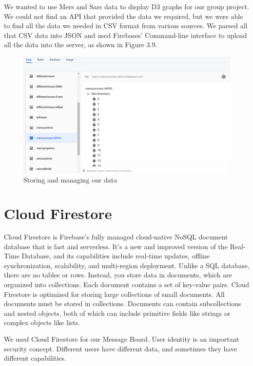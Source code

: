 We wanted to use Mers and Sars data to display D3 graphs for our group project.
We could not find an API that provided the data we required, but we were able to find all the data we needed in CSV format from various sources. 
We parsed all that CSV data into JSON and used Firebases’ Command-line interface to upload all the data into the server, as shown in Figure 3.9.

\begin{figure}[H]
    \centering
    \includegraphics[scale=0.35]{img/Firebasedb.PNG}
    \caption{Storing and managing our data}
    \label{fig:my_labe4}
\end{figure}

\section{Cloud Firestore}
Cloud Firestore is Firebase's fully managed cloud-native NoSQL document database that is fast and serverless. It's a new and improved version of the Real-Time Database, and its capabilities include real-time updates, offline synchronization, scalability, and multi-region deployment. Unlike a SQL database, there are no tables or rows. Instead, you store data in documents, which are organized into collections. Each document contains a set of key-value pairs.
Cloud Firestore is optimized for storing large collections of small documents.
All documents must be stored in collections. Documents can contain subcollections and nested objects, both of which can include primitive fields like strings or complex objects like lists.\cite{firestore}


\vspace{6mm}

We used Cloud Firestore for our Message Board.
User identity is an important security concept. Different users have different data, and sometimes they have different capabilities.

